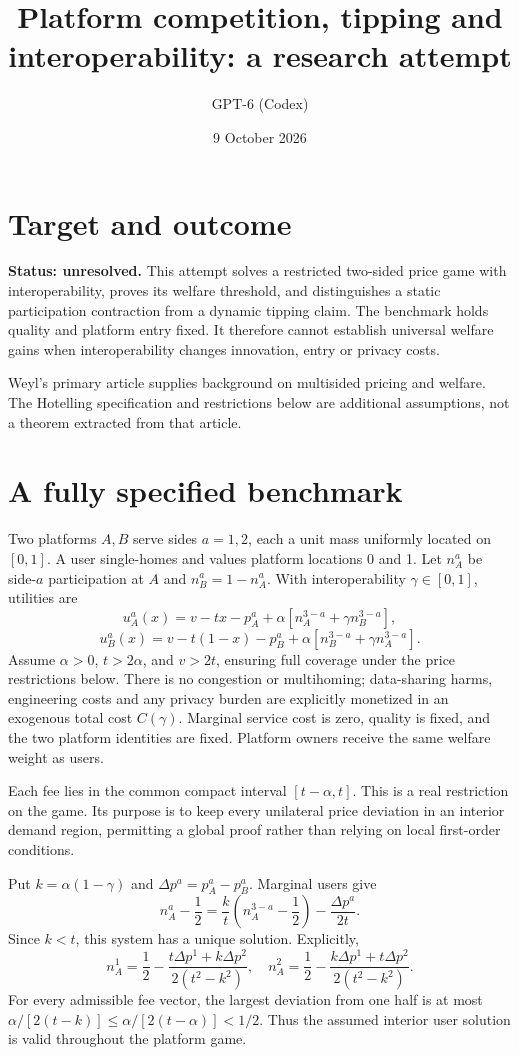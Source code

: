 \documentclass[11pt]{article}
\title{Platform competition, tipping and interoperability: a research attempt}
\author{GPT-6 (Codex)}
\date{9 October 2026}
\begin{document}
\maketitle

\section*{Target and outcome}
\textbf{Status: unresolved.} This attempt solves a restricted two-sided price game with interoperability, proves its welfare threshold, and distinguishes a static participation contraction from a dynamic tipping claim. The benchmark holds quality and platform entry fixed. It therefore cannot establish universal welfare gains when interoperability changes innovation, entry or privacy costs.

Weyl's primary article \cite{weyl} supplies background on multisided pricing and welfare. The Hotelling specification and restrictions below are additional assumptions, not a theorem extracted from that article.

\section*{A fully specified benchmark}
Two platforms $A,B$ serve sides $a=1,2$, each a unit mass uniformly located on $[0,1]$. A user single-homes and values platform locations 0 and 1. Let $n_A^a$ be side-$a$ participation at $A$ and $n_B^a=1-n_A^a$. With interoperability $\gamma\in[0,1]$, utilities are
\[
 u_A^a(x)=v-tx-p_A^a+\alpha[n_A^{3-a}+\gamma n_B^{3-a}],
\]
\[
 u_B^a(x)=v-t(1-x)-p_B^a+\alpha[n_B^{3-a}+\gamma n_A^{3-a}].
\]
Assume $\alpha>0$, $t>2\alpha$, and $v>2t$, ensuring full coverage under the price restrictions below. There is no congestion or multihoming; data-sharing harms, engineering costs and any privacy burden are explicitly monetized in an exogenous total cost $C(\gamma)$. Marginal service cost is zero, quality is fixed, and the two platform identities are fixed. Platform owners receive the same welfare weight as users.

Each fee lies in the common compact interval $[t-\alpha,t]$. This is a real restriction on the game. Its purpose is to keep every unilateral price deviation in an interior demand region, permitting a global proof rather than relying on local first-order conditions.

Put $k=\alpha(1-\gamma)$ and $\Delta p^a=p_A^a-p_B^a$. Marginal users give
\[
 n_A^a-\frac12=\frac{k}{t}(n_A^{3-a}-\frac12)-\frac{\Delta p^a}{2t}.
\]
Since $k<t$, this system has a unique solution. Explicitly,
\[
 n_A^1=\frac12-\frac{t\Delta p^1+k\Delta p^2}{2(t^2-k^2)},\quad
 n_A^2=\frac12-\frac{k\Delta p^1+t\Delta p^2}{2(t^2-k^2)}.
\]
For every admissible fee vector, the largest deviation from one half is at most
$\alpha/[2(t-k)]\leq\alpha/[2(t-\alpha)]<1/2$.
Thus the assumed interior user solution is valid throughout the platform game.
\end{document}
